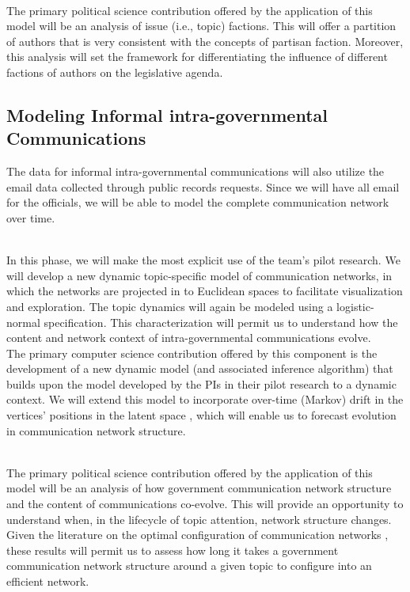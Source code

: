 ~\\
 The primary political science contribution offered by the application of this model will be an analysis of issue (i.e., topic) factions. This will offer a partition of authors that is very consistent with the concepts of partisan faction. Moreover, this analysis will set the framework for differentiating the influence of different factions of authors on the legislative agenda.

\subsection{Modeling Informal intra-governmental Communications}

 The data for informal
intra-governmental communications will also utilize the email data
collected through public records requests. Since we will have all
email for the officials, we will be able to model the complete
communication network over time.

~\\
 In this phase, we will make the
most explicit use of the team's pilot research. We will develop a new
dynamic topic-specific model of communication networks, in which the
networks are projected in to Euclidean spaces to facilitate
visualization and exploration. The topic dynamics will again be
modeled using a logistic-normal specification. This characterization
will permit us to understand how the content and network context of
intra-governmental communications evolve. 
~\\
 The primary computer
science contribution offered by this component is the development of a
new dynamic model (and associated inference algorithm) that builds
upon the model developed by the PIs in their pilot research
\cite{Krafft2012} to a dynamic context. We will extend this model to
incorporate over-time (Markov) drift in the vertices' positions in the
latent space \cite{Sarkar2005}, which will enable us to forecast
evolution in communication network structure.

~\\
 The primary political science contribution offered by the application of this model will be an analysis of how government communication network structure and the content of communications co-evolve. This will provide an opportunity to understand when, in the lifecycle of topic attention, network structure changes. Given the literature on the optimal configuration of communication networks \cite{Mason2008,Mason2012}, these results will permit us to assess how long it takes  a government communication network structure around a given topic to configure into an efficient network.




